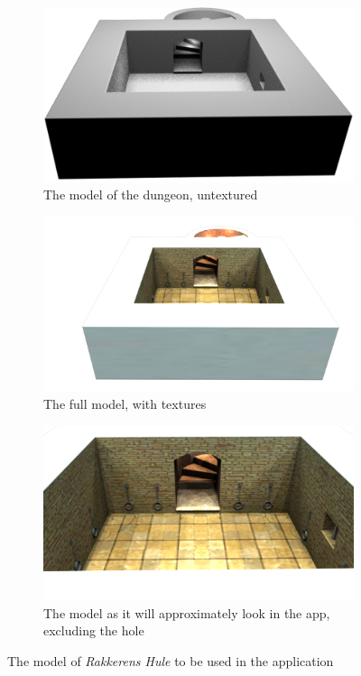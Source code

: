 \begin{figure}
    \centering
        \begin{subfigure}[h!]{0.7\textwidth}
    	\centering
        \includegraphics[width=\textwidth]{figures/model.png}
        \caption{The model of the dungeon, untextured}\label{fig:model}
    \end{subfigure}
    \begin{subfigure}[h!]{0.7\textwidth}
    	\centering
        \includegraphics[width=\textwidth]{figures/model_total.png}
        \caption{The full model, with textures}\label{fig:total}
    \end{subfigure}
    \begin{subfigure}[h!]{0.7\textwidth}
    	\centering
        \includegraphics[width=\textwidth]{figures/model_long.png}
        \caption{The model as it will approximately look in the app, excluding the hole}\label{fig:long}
    \end{subfigure}
    \caption{The model of \textit{Rakkerens Hule} to be used in the application}
\end{figure}

